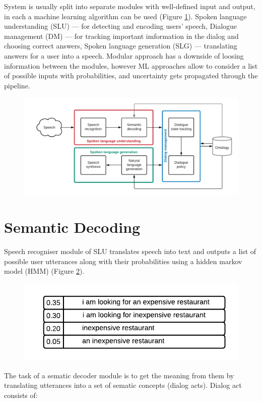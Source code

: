 \documentclass[12pt,titlepage,a4paper]{article}
\begin{document}
System is usually split into separate modules with well-defined input and output, in each a machine learning algo\-rithm can be used (Figure \ref{fig:SDS-main}). Spoken language understanding (SLU) --- for detecting and encoding users' speech, Dialogue manage\-ment (DM) --- for tracking important imformation in the dialog and choosing correct answers, Spoken language gene\-ration (SLG) --- translating answers for a user into a speech. Modular approach has a downside of loosing information bet\-ween the modules, however ML approaches allow to consider a list of possible inputs with probabilities, and uncertainty gets propagated through the pipeline.

\begin{figure}[!h]
    \includegraphics[width=\linewidth]{SDS-main.png}
    \caption{}
    \label{fig:SDS-main}
\end{figure}


\pagebreak
\section{Semantic Decoding}
Speech recogniser module of SLU translates speech into text and outputs a list of possible user utterances along with their probabilities using a hidden markov model (HMM)\cite{HMM} (Figure \ref{fig:several}).

\begin{figure}[!h]
    \centering
    \includegraphics[width=0.65\linewidth]{uncertanty.png}
    \caption{}
    \label{fig:several}
\end{figure}
The task of a sematic decoder module is to get the meaning from them by translating utterances into a set of sematic concepts (dia\-log acts). Dialog act consists of: 
\end{document}
